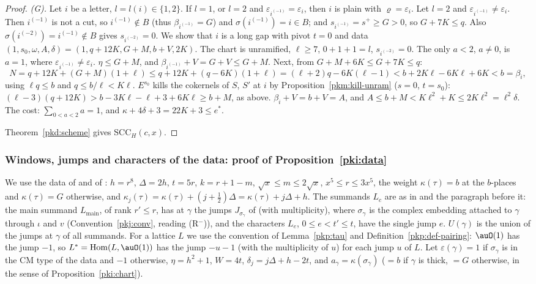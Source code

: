 \documentclass[10pt]{amsart}
\theoremstyle{definition}
\theoremstyle{remark}
\begin{document}
\begin{proof}
\emph{(G).} Let $i$ be a letter, $l=l(i)\in\{1,2\}$. If $l=1$, or $l=2$ and
$\varepsilon_{i^{(-1)}}=\varepsilon_i$, then $i$ is plain with $\varrho=\varepsilon_i$. Let $l=2$ and
$\varepsilon_{i^{(-1)}}\ne\varepsilon_i$. Then $i^{(-1)}$ is not a cut, so $i^{(-1)}\notin B$ (thus
$\beta_{i^{(-1)}}=G$) and $\sigma(i^{(-1)})=i\in B$; and $s_{i^{(-1)}}=s^+\ge G>0$, so $G+7K\le q$. Also
$\sigma(i^{(-2)})=i^{(-1)}\notin B$ gives $s_{i^{(-2)}}=0$. We show that $i$ is a long gap with pivot
$t=0$ and data $(1,s_0,\omega,A,\delta)=(1,q+12K,G+M,b+V,2K)$. The chart is unramified, $\ell\ge7$,
$0+1+1=l$, $s_{i^{(-2)}}=0$. The only $a<2$, $a\ne0$, is $a=1$, where
$\varepsilon_{i^{(-1)}}\ne\varepsilon_i$. $\eta\le G+M$, and $\beta_{i^{(-1)}}+V=G+V\le G+M$. Next, from
$G+M+6K\le G+7K\le q$:
\[
N=q+12K+(G+M)(1+\ell)\le q+12K+(q-6K)(1+\ell)=(\ell+2)q-6K(\ell-1)
<b+2K\ell-6K\ell+6K<b=\beta_i,
\]
using $\ell q\le b$ and $q\le b/\ell<K\ell$. $E^{s_0}$ kills the cokernels of $S$, $S'$ at $i$ by
Proposition~\ref{pkm:kill-unram} ($s=0$, $t=s_0$): $(\ell-3)(q+12K)>b-3K\ell-\ell+3+6K\ell\ge b+M$, as
above. $\beta_i+V=b+V=A$, and $A\le b+M<K\ell^2+K\le2K\ell^2=\ell^2\delta$. The cost: $\sum_{0<a<2}a=1$,
and $\kappa+4\delta+3=22K+3\le e^*$.

Theorem~\ref{pkd:scheme} gives $\mathrm{SCC}_H(c,x)$.
\end{proof}

\subsubsection{Windows, jumps and characters of the data: proof of Proposition~\ref{pki:data}}\label{pkd:ss-data}

We use the data of {\cite[\S2]{P55}} and of {\cite[(36)]{P46}}: $h=r^8$, $\Delta=2h$, $t=5r$,
$k=r+1-m$, $\sqrt x\le m\le2\sqrt x$, $x^5\le r\le3x^5$, the weight $\kappa(\tau)=b$ at the $b$-places
and $\kappa(\tau)=G$ otherwise, and $\kappa_j(\tau)=\kappa(\tau)+(j+\frac12)\Delta=\kappa(\tau)+j\Delta+h$.
The summands $L_c$ are as in {\cite[Proposition~5.2]{P55}} and the paragraph before it: the main summand
$L_{\mathrm{main}}$, of rank $r'\le r$, has at $\gamma$ the jumps $J_{\sigma_\gamma}$ of
{\cite[Definition~2.6(M2)]{P55}} (with multiplicity), where $\sigma_\gamma$ is the complex embedding
attached to $\gamma$ through $\iota$ and $v$ (Convention~\ref{pkj:conv}, reading (R$^-$)), and the characters $L_e$, $0\le e<t'\le t$, have the single jump $e$. $U(\gamma)$ is
the union of the jumps at $\gamma$ of all summands. For a lattice $L$ we use the convention of
Lemma~\ref{pkp:tau} and Definition~\ref{pkp:def-pairing}: $\auO(1)$ has the jump $-1$, so
$L^*=\operatorname{Hom}(L,\auO(1))$ has the jump $-u-1$ (with the multiplicity of $u$) for each jump
$u$ of $L$. Let $\varepsilon(\gamma)=1$ if $\sigma_\gamma$ is in the CM type of the data and $-1$
otherwise, $\eta=h^2+1$, $W=4t$, $\delta_j=j\Delta+h-2t$, and $a_\gamma=\kappa(\sigma_\gamma)$ ($=b$
if $\gamma$ is thick, $=G$ otherwise, in the sense of Proposition~\ref{pki:chart}).
\end{document}
